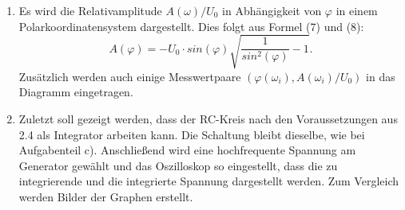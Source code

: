 \begin{enumerate}
	\item Es wird die Relativamplitude $A(\omega) / U_0$ in Abhängigkeit von $\varphi$ in einem Polarkoordinatensystem dargestellt.
	Dies folgt aus Formel (7) und (8):
	\begin{equation}
	A(\varphi) = -U_0\cdot sin(\varphi)\sqrt{\frac{1}{sin^2(\varphi)}-1}\text{.}
	\end{equation}
	Zusätzlich werden auch einige Messwertpaare $(\varphi(\omega_i), A(\omega_i)/U_0)$ in das Diagramm
	eingetragen.

       \item Zuletzt soll gezeigt werden, dass der RC-Kreis nach den Voraussetzungen aus 2.4 als
       Integrator arbeiten kann. Die Schaltung bleibt dieselbe, wie bei Aufgabenteil c).
       Anschließend wird eine hochfrequente Spannung am Generator gewählt und das Oszilloskop so eingestellt, dass
       die zu integrierende und die integrierte Spannung dargestellt werden. Zum Vergleich werden
       Bilder der Graphen erstellt.



\end{enumerate}
